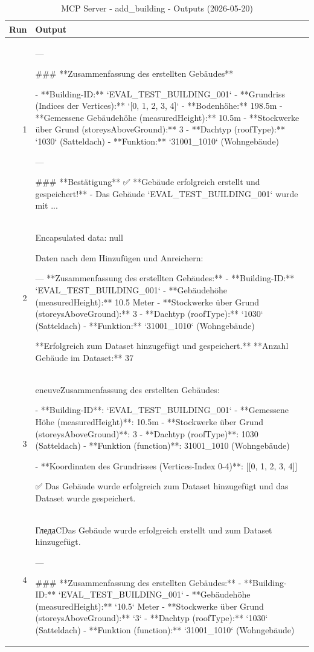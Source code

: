 \documentclass[a4paper,11pt]{article}
\begin{document}
\begin{table}[ht]
\centering
\scriptsize
\caption{MCP Server - add\_building - Outputs (2026-05-20)}
\label{tab:mcp\_add\_building\_outputs\_2026-05-20}
\begin{tabular}{r p{12cm}}
\hline
Run & Output \\
\hline
1 & ---

\#\#\# **Zusammenfassung des erstellten Gebäudes**

- **Building-ID:** `EVAL\_TEST\_BUILDING\_001`
- **Grundriss (Indices der Vertices):** `[0, 1, 2, 3, 4]`
- **Bodenhöhe:** 198.5m
- **Gemessene Gebäudehöhe (measuredHeight):** 10.5m
- **Stockwerke über Grund (storeysAboveGround):** 3
- **Dachtyp (roofType):** `1030` (Satteldach)
- **Funktion:** `31001\_1010` (Wohngebäude)

---

\#\#\# **Bestätigung**
✅ **Gebäude erfolgreich erstellt und gespeichert!**
- Das Gebäude `EVAL\_TEST\_BUILDING\_001` wurde mit ... \\
2 & Encapsulated data: null

Daten nach dem Hinzufügen und Anreichern:

---
**Zusammenfassung des erstellten Gebäudes:**
- **Building-ID:** `EVAL\_TEST\_BUILDING\_001`
- **Gebäudehöhe (measuredHeight):** 10.5 Meter
- **Stockwerke über Grund (storeysAboveGround):** 3
- **Dachtyp (roofType):** `1030` (Satteldach)
- **Funktion:** `31001\_1010` (Wohngebäude)

**Erfolgreich zum Dataset hinzugefügt und gespeichert.**
**Anzahl Gebäude im Dataset:** 37 \\
3 & eneuveZusammenfassung des erstellten Gebäudes:

- **Building-ID**: `EVAL\_TEST\_BUILDING\_001`
- **Gemessene Höhe (measuredHeight)**: 10.5m
- **Stockwerke über Grund (storeysAboveGround)**: 3
- **Dachtyp (roofType)**: 1030 (Satteldach)
- **Funktion (function)**: 31001\_1010 (Wohngebäude)

- **Koordinaten des Grundrisses (Vertices-Index 0-4)**:
  [[0, 1, 2, 3, 4]]

✅ Das Gebäude wurde erfolgreich zum Dataset hinzugefügt und das Dataset wurde gespeichert. \\
4 & ГледаCDas Gebäude wurde erfolgreich erstellt und zum Dataset hinzugefügt.

---

\#\#\# **Zusammenfassung des erstellten Gebäudes:**
- **Building-ID:** `EVAL\_TEST\_BUILDING\_001`
- **Gebäudehöhe (measuredHeight):** `10.5` Meter
- **Stockwerke über Grund (storeysAboveGround):** `3`
- **Dachtyp (roofType):** `1030` (Satteldach)
- **Funktion (function):** `31001\_1010` (Wohngebäude)


\end{tabular}
\end{table}
\end{document}
